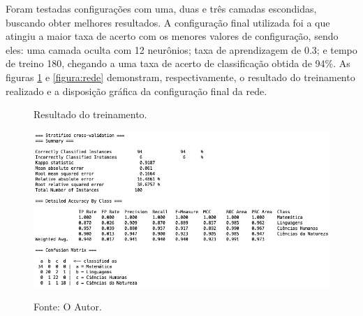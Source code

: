 Foram testadas configurações com uma, duas e três camadas escondidas, buscando obter melhores resultados. A configuração final utilizada foi a que atingiu a maior taxa de acerto com os menores valores de configuração, sendo eles: uma camada oculta com 12 neurônios; taxa de aprendizagem de 0.3; e tempo de treino 180, chegando a uma taxa de acerto de classificação obtida de 94\%. As figuras \ref{figura:resultado} e \ref{figura:rede} demonstram, respectivamente, o resultado do treinamento realizado e a disposição gráfica da configuração final da rede.


\begin{figure}[H]
	\caption{Resultado do treinamento.}
	\centering %
	\includegraphics[width=16cm]{resources/resultado_treinamento.png} %
	\label{figura:resultado}
	\captionsetup{singlelinecheck = false, format= hang, justification=raggedright, labelsep=space, width=16cm}
	\caption*{\footnotesize Fonte: O Autor.}
\end{figure}

